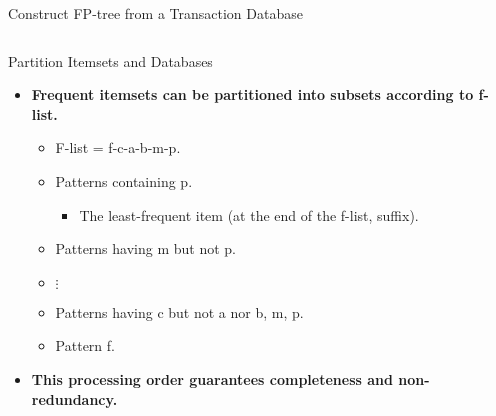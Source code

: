 \begin{frame}{Construct FP-tree from a Transaction Database}
\begin{columns}
\begin{column}{0.5\textwidth}
{
			}
		\end{column}
	\end{columns}
\end{frame}

\begin{frame}{Partition Itemsets and Databases}
	\begin{itemize}
		\item \textbf{Frequent itemsets can be partitioned into subsets
			      according to f-list.}
		      \begin{itemize}
			      \item F-list = f-c-a-b-m-p.
			      \item Patterns containing p.
			            \begin{itemize}
				            \item The least-frequent item (at the end of the f-list,
				                  suffix).
			            \end{itemize}
			      \item Patterns having m but not p.
			      \item $\vdots$
			      \item Patterns having c but not a nor b, m, p.
			      \item Pattern f.
		      \end{itemize}
		\item \textbf{This processing order guarantees completeness and
			      non-redundancy.}
	\end{itemize}
\end{frame}

